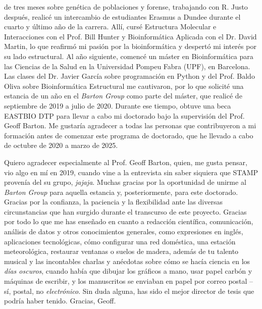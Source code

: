 de tres meses sobre genética de poblaciones y forense, trabajando con R. Justo después, realicé un intercambio de estudiantes Erasmus a Dundee durante el cuarto y último año de la carrera. Allí, cursé Estructura Molecular e Interacciones con el Prof. Bill Hunter y Bioinformática Aplicada con el Dr. David Martin, lo que reafirmó mi pasión por la bioinformática y despertó mi interés por su lado estructural. Al año siguiente, comencé un máster en Bioinformática para las Ciencias de la Salud en la Universidad Pompeu Fabra (UPF), en Barcelona. Las clases del Dr. Javier García sobre programación en Python y del Prof. Baldo Oliva sobre Bioinformática Estructural me cautivaron, por lo que solicité una estancia de un año en el \textit{Barton Group} como parte del máster, que realicé de septiembre de 2019 a julio de 2020. Durante ese tiempo, obtuve una beca EASTBIO DTP para llevar a cabo mi doctorado bajo la supervisión del Prof. Geoff Barton. Me gustaría agradecer a todas las personas que contribuyeron a mi formación antes de comenzar este programa de doctorado, que he llevado a cabo de octubre de 2020 a marzo de 2025.

Quiero agradecer especialmente al Prof. Geoff Barton, quien, me gusta pensar, vio algo en mí en 2019, cuando vine a la entrevista sin saber siquiera que STAMP provenía del su grupo, \textit{jajaja}. Muchas gracias por la oportunidad de unirme al \textit{Barton Group} para aquella estancia y, posteriormente, para este doctorado. Gracias por la confianza, la paciencia y la flexibilidad ante las diversas circunstancias que han surgido durante el transcurso de este proyecto. Gracias por todo lo que me has enseñado en cuanto a redacción científica, comunicación, análisis de datos y otros conocimientos generales, como expresiones en inglés, aplicaciones tecnológicas, cómo configurar una red doméstica, una estación meteorológica, restaurar ventanas o suelos de madera, además de tu talento musical y las incontables charlas y anécdotas sobre cómo se hacía ciencia en los \textit{días oscuros}, cuando había que dibujar los gráficos a mano, usar papel carbón y máquinas de escribir, y los manuscritos se enviaban en papel por correo postal -- sí, postal, no \textit{electrónico}. Sin duda alguna, has sido el mejor director de tesis que podría haber tenido. Gracias, Geoff.

